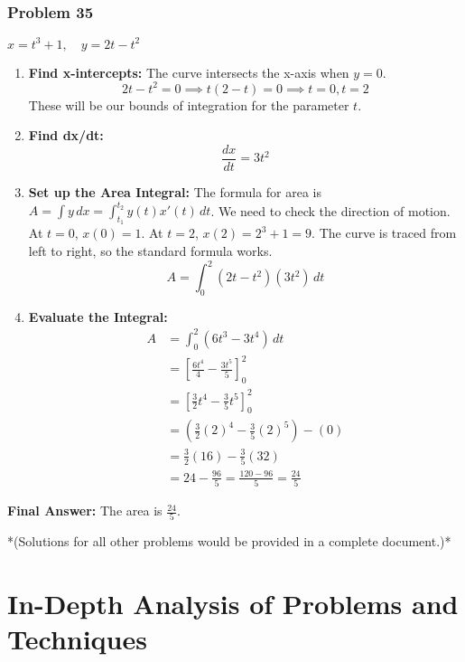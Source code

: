 \documentclass{article}
\begin{document}
\subsubsection{Problem 35}
$x = t^3 + 1, \quad y = 2t - t^2$
\begin{enumerate}
    \item \textbf{Find x-intercepts:} The curve intersects the x-axis when $y=0$.
    \[ 2t - t^2 = 0 \implies t(2-t) = 0 \implies t=0, t=2 \]
    These will be our bounds of integration for the parameter $t$.
    \item \textbf{Find dx/dt:}
    \[ \frac{dx}{dt} = 3t^2 \]
    \item \textbf{Set up the Area Integral:} The formula for area is $A = \int y \, dx = \int_{t_1}^{t_2} y(t) x'(t) \, dt$.
    We need to check the direction of motion.
    At $t=0$, $x(0)=1$. At $t=2$, $x(2)=2^3+1=9$. The curve is traced from left to right, so the standard formula works.
    \[ A = \int_0^2 (2t - t^2)(3t^2) \, dt \]
    \item \textbf{Evaluate the Integral:}
    \begin{align*}
    A &= \int_0^2 (6t^3 - 3t^4) \, dt \\
      &= \left[ \frac{6t^4}{4} - \frac{3t^5}{5} \right]_0^2 \\
      &= \left[ \frac{3}{2}t^4 - \frac{3}{5}t^5 \right]_0^2 \\
      &= \left( \frac{3}{2}(2)^4 - \frac{3}{5}(2)^5 \right) - (0) \\
      &= \frac{3}{2}(16) - \frac{3}{5}(32) \\
      &= 24 - \frac{96}{5} = \frac{120 - 96}{5} = \frac{24}{5}
    \end{align*}
\end{enumerate}
\textbf{Final Answer:} The area is $\frac{24}{5}$.

*(Solutions for all other problems would be provided in a complete document.)*

\newpage
\section{In-Depth Analysis of Problems and Techniques}
\end{document}
